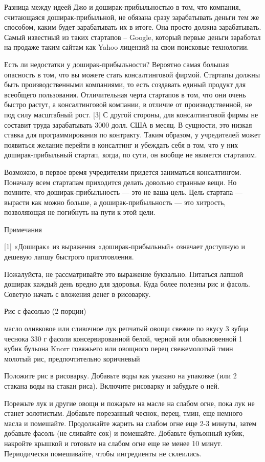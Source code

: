 \documentclass[ebook,12pt,oneside,openany]{memoir}
\begin{document}
Разница между идеей Джо и доширак-прибыльностью в том, что компания,
считающаяся доширак-прибыльной, не обязана сразу зарабатывать деньги
тем же способом, каким будет зарабатывать их в итоге. Она просто
должна зарабатывать. Самый известный из таких стартапов – Google,
который первые деньги заработал на продаже таким сайтам как Yahoo
лицензий на свои поисковые технологии.

Есть ли недостатки у доширак-прибыльности? Вероятно самая большая
опасность в том, что вы можете стать консалтинговой фирмой. Стартапы
должны быть производственными компаниями, то есть создавать единый
продукт для всеобщего пользования. Отличительная черта стартапов в
том, что они очень быстро растут, а консалтинговой компании, в отличие
от производственной, не под силу масштабный рост. [3] С другой
стороны, для консалтинговой фирмы не составит труда зарабатывать 3000
долл. США в месяц. В сущности, это низкая ставка для программирования
по контракту. Таким образом, у учредителей может появиться желание
перейти в консалтинг и убеждать себя в том, что у них
доширак-прибыльный стартап, когда, по сути, он вообще не является
стартапом.

Возможно, в первое время учредителям придется заниматься консалтингом.
Поначалу всем стартапам приходится делать довольно странные вещи. Но
помните, что доширак-прибыльность — это не ваша цель. Цель стартапа —
вырасти как можно больше, а доширак-прибыльность — это хитрость,
позволяющая не погибнуть на пути к этой цели.

Примечания

[1] «Доширак» из выражения «доширак-прибыльный» означает доступную и
дешевую лапшу быстрого приготовления.

Пожалуйста, не рассматривайте это выражение буквально. Питаться лапшой
доширак каждый день вредно для здоровья. Куда более полезны рис и
фасоль. Советую начать с вложения денег в рисоварку.

Рис с фасолью (2 порции)

масло оливковое или сливочное лук репчатый овощи свежие по вкусу 3
зубца чеснока 330 г фасоли консервированной белой, черной или
обыкновенной 1 кубик бульона Knorr говяжьего или овощного перец
свежемолотый тмин молотый рис, предпочтительно коричневый


Положите рис в рисоварку. Добавьте воды как указано на упаковке (или 2
стакана воды на стакан риса). Включите рисоварку и забудьте о ней.

Порежьте лук и другие овощи и пожарьте на масле на слабом огне, пока
лук не станет золотистым. Добавьте порезанный чеснок, перец, тмин, еще
немного масла и помешайте. Продолжайте жарить на слабом огне еще 2-3
минуты, затем добавьте фасоль (не сливайте сок) и помешайте. Добавьте
бульонный кубик, накройте крышкой и готовьте на слабом огне еще не
менее 10 минут. Периодически помешивайте, чтобы ингредиенты не
склеились.
\end{document}

